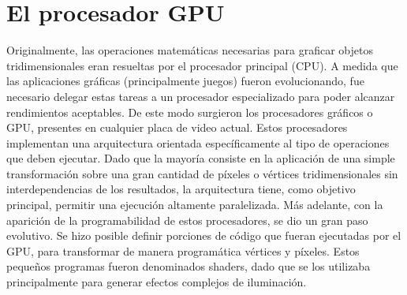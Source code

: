 \documentclass[a4paper,10pt]{report}
\begin{document}
\section{El procesador GPU}



% 


% 
% 

Originalmente, las operaciones matemáticas necesarias para graficar objetos tridimensionales eran resueltas por el procesador principal (CPU). 
A medida que las aplicaciones gráficas (principalmente juegos) fueron evolucionando, fue necesario delegar estas tareas a un procesador especializado para poder
alcanzar rendimientos aceptables. De este modo surgieron los procesadores gráficos o GPU, presentes en cualquier placa de video actual. 
Estos procesadores implementan una arquitectura orientada específicamente al tipo de operaciones que deben ejecutar. 
Dado que la mayoría consiste en la aplicación de una simple transformación sobre una gran cantidad de píxeles o vértices tridimensionales sin interdependencias de los resultados, 
la arquitectura tiene, como objetivo principal, permitir una ejecución altamente paralelizada.
Más adelante, con la aparición de la programabilidad de estos procesadores, se dio un gran paso evolutivo. 
Se hizo posible definir porciones de código que fueran ejecutadas por el GPU, para transformar de manera programática vértices y píxeles. 
Estos pequeños programas fueron denominados shaders, dado que se los utilizaba principalmente para generar efectos complejos de iluminación. 
\end{document}
